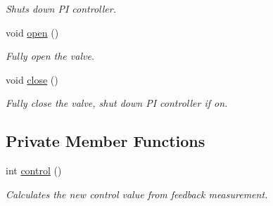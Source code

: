 \begin{DoxyCompactItemize}
\begin{DoxyCompactList}\small\item\em Shuts down PI controller. \end{DoxyCompactList}\item 
\mbox{\label{class_a_s_e6030_1_1_flow_control_valve_a12db565b5451a4a7ee1e13ac7f031d00}} 
void \hyperlink{class_a_s_e6030_1_1_flow_control_valve_a12db565b5451a4a7ee1e13ac7f031d00}{open} ()
\begin{DoxyCompactList}\small\item\em Fully open the valve. \end{DoxyCompactList}\item 
\mbox{\label{class_a_s_e6030_1_1_flow_control_valve_a4b22d19ca0ed6eb60f31705f2ee36dd7}} 
void \hyperlink{class_a_s_e6030_1_1_flow_control_valve_a4b22d19ca0ed6eb60f31705f2ee36dd7}{close} ()
\begin{DoxyCompactList}\small\item\em Fully close the valve, shut down PI controller if on. \end{DoxyCompactList}\end{DoxyCompactItemize}
\subsection*{Private Member Functions}
\begin{DoxyCompactItemize}
\item 
int \hyperlink{class_a_s_e6030_1_1_flow_control_valve_a89cfb29a75e92e322943b6d7ca780436}{control} ()
\begin{DoxyCompactList}\small\item\em Calculates the new control value from feedback measurement. \end{DoxyCompactList}\end{DoxyCompactItemize}
